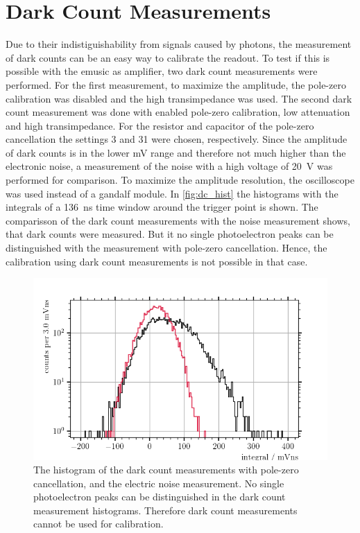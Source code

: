 \section{Dark Count Measurements}
Due to their indistiguishability from signals caused by photons, the measurement of dark counts can be an easy way to calibrate the readout.
To test if this is possible with the \ac{emusic} as amplifier, two dark count measurements were performed.
For the first measurement, to maximize the amplitude, the pole-zero calibration was disabled and the high transimpedance was used.
The second dark count measurement was done with enabled pole-zero calibration, low attenuation and high transimpedance.
For the resistor and capacitor of the pole-zero cancellation the settings 3 and 31 were chosen, respectively.
Since the amplitude of dark counts is in the lower \si{\milli\volt} range and therefore not much higher than the electronic noise, a measurement of the noise with a high voltage of \SI{20}{\volt} was performed for comparison.
To maximize the amplitude resolution, the oscilloscope was used instead of a \ac{gandalf} module.
In \autoref{fig:dc_hist} the histograms with the integrals of a \SI{136}{\nano\second} time window around the trigger point is shown. 
The comparisson of the dark count measurements with the noise measurement shows, that dark counts were measured.
But it no single photoelectron peaks can be distinguished with the measurement with pole-zero cancellation.
Hence, the calibration using dark count measurements is not possible in that case.
\begin{figure}
	\centering
	\includegraphics[width=1.\textwidth]{pictures/dc_hist_pz}
	\caption[Histogram of the dark count measurements with pole-zero cancellation.]{The histogram of the dark count measurements with pole-zero cancellation, and the electric noise measurement. No single photoelectron peaks can be distinguished in the dark count measurement histograms. Therefore dark count measurements cannot be used for calibration.} 
	\label{fig:dc_hist}
\end{figure}
